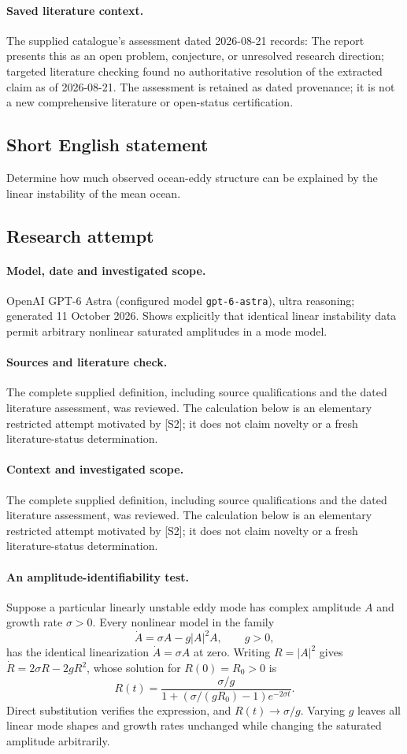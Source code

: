 \documentclass[11pt]{article}
\begin{document}
\paragraph{Saved literature context.} The supplied catalogue's assessment dated 2026-08-21 records: The report presents this as an open problem, conjecture, or unresolved research direction; targeted literature checking found no authoritative resolution of the extracted claim as of 2026-08-21. The assessment is retained as dated provenance; it is not a new comprehensive literature or open-status certification.
\subsection{Short English statement}
Determine how much observed ocean-eddy structure can be explained by the linear instability of the mean ocean.
\subsection{Research attempt}
\paragraph{Model, date and investigated scope.}
OpenAI GPT-6 Astra (configured model \texttt{gpt-6-astra}), ultra reasoning; generated 11 October 2026. Shows explicitly that identical linear instability data permit arbitrary nonlinear saturated amplitudes in a mode model.

\paragraph{Sources and literature check.}
The complete supplied definition, including source qualifications and the dated literature assessment, was reviewed. The calculation below is an elementary restricted attempt motivated by [S2]; it does not claim novelty or a fresh literature-status determination.

\paragraph{Context and investigated scope.} The complete supplied definition, including source qualifications and the dated literature assessment, was reviewed. The calculation below is an elementary restricted attempt motivated by [S2]; it does not claim novelty or a fresh literature-status determination.

\paragraph{An amplitude-identifiability test.} Suppose a particular linearly unstable eddy mode has complex amplitude $A$ and growth rate $\sigma>0$. Every nonlinear model in the family
\[
 \dot A=\sigma A-g|A|^2A,\qquad g>0,
\]
has the identical linearization $\dot A=\sigma A$ at zero. Writing $R=|A|^2$ gives $\dot R=2\sigma R-2gR^2$, whose solution for $R(0)=R_0>0$ is
\[
 R(t)=\frac{\sigma/g}{1+(\sigma/(gR_0)-1)e^{-2\sigma t}}.
\]
Direct substitution verifies the expression, and $R(t)\to\sigma/g$. Varying $g$ leaves all linear mode shapes and growth rates unchanged while changing the saturated amplitude arbitrarily.
\end{document}
